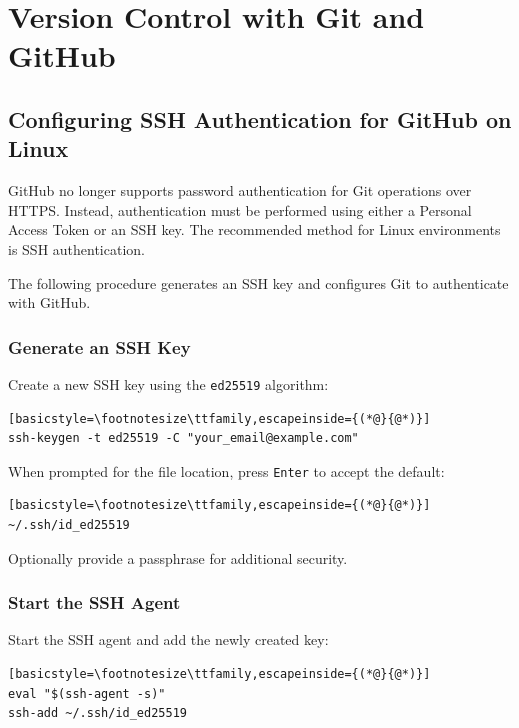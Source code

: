 \chapter{Version Control with Git and GitHub}
\label{ch:git}

\section{Configuring SSH Authentication for GitHub on Linux}
GitHub no longer supports password authentication for Git operations over HTTPS. 
Instead, authentication must be performed using either a Personal Access Token or 
an SSH key. The recommended method for Linux environments is SSH authentication.

The following procedure generates an SSH key and configures Git to authenticate
with GitHub.

\subsection{Generate an SSH Key}

Create a new SSH key using the \texttt{ed25519} algorithm:

\begin{lstlisting}[basicstyle=\footnotesize\ttfamily,escapeinside={(*@}{@*)}]
ssh-keygen -t ed25519 -C "your_email@example.com"
\end{lstlisting}

When prompted for the file location, press \texttt{Enter} to accept the default:

\begin{lstlisting}[basicstyle=\footnotesize\ttfamily,escapeinside={(*@}{@*)}]
~/.ssh/id_ed25519
\end{lstlisting}

Optionally provide a passphrase for additional security.

\subsection{Start the SSH Agent}

Start the SSH agent and add the newly created key:

\begin{lstlisting}[basicstyle=\footnotesize\ttfamily,escapeinside={(*@}{@*)}]
eval "$(ssh-agent -s)"
ssh-add ~/.ssh/id_ed25519
\end{lstlisting}

